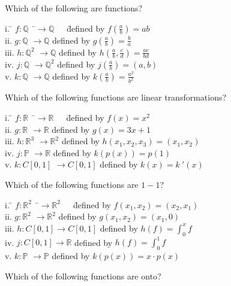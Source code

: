 \begin{myexb}[\bd{b}]
	Which of the following are functions?
	\begin{tabbing}
		\indent i. \quad \= $f:\mathbb{Q}$ \ \=$\rightarrow \mathbb{Q} $\ \ \   \=defined by $f(\frac{a}{b})= ab$   \\
		\indent ii. \> $g:\mathbb{Q}$ \>$\rightarrow \mathbb{Q} $ \>defined by  $g(\frac{a}{b}) = \frac{b}{a}$ \\ 
		\indent iii. \> $h:\mathbb{Q}^2 $ \>$\rightarrow \mathbb{Q} $ \>defined by  $h(\frac{a}{b},\frac{c}{d}) = \frac{ac}{bd}$  \\
		\indent iv. \>  $j:\mathbb{Q} $ \>$\rightarrow \mathbb{Q}^2 $ \>defined by  $j(\frac{a}{b}) = (a,b)$  \\  
		\indent v. \>  $k:\mathbb{Q} $ \>$\rightarrow \mathbb{Q} $ \>defined by  $k(\frac{a}{b}) = \frac{a^2}{b^2}$  
	\end{tabbing}
	Which of the following functions are linear transformations?
	\begin{tabbing}
		\indent i. \quad \= $f:\mathbb{R}$ \ \=$\rightarrow \mathbb{R} $\ \ \   \=defined by $f(x)= x^2$   \\
		\indent ii. \> $g:\mathbb{R}$ \>$\rightarrow \mathbb{R} $ \>defined by  $g(x) = 3x+1$ \\ 
		\indent iii. \> $h:\mathbb{R}^3 $ \>$\rightarrow \mathbb{R}^2 $ \>defined by  $h(x_1,x_2,x_3) = (x_1,x_2)$  \\
		\indent iv. \>  $j:\mathbb{P} $ \>$\rightarrow \mathbb{R}$ \>defined by  $k(p(x)) = p(1)$ \\
		\indent v. \>  $k:C[0,1] $ $\rightarrow C[0,1] $ defined by  $k(x) = k\ '(x)$      
	\end{tabbing} 
	Which of the following functions are $1-1$? 
	\begin{tabbing}
		\indent i. \quad \= $f:\mathbb{R}^2$ \ \=$\rightarrow \mathbb{R}^2 $\ \ \   \=defined by $f(x_1,x_2)= (x_2 ,x_1)$  \\
		\indent ii. \> $g:\mathbb{R}^2$ \>$\rightarrow \mathbb{R}^2 $ \>defined by  $g(x_1, x_2) = (x_1,0) $ \\ 
		\indent iii. \> $h:C[0,1] \rightarrow C[0,1] $ defined by  $h(f) = \int^x_0f $  \\
		\indent iv. \>  $j:C[0,1] \rightarrow \mathbb{R} $ defined by  $h(f) = \int^1_0f $  \\
		\indent v. \>  $k:\mathbb{P} $ \>$\rightarrow \mathbb{P}$ \>defined by  $k(p(x)) = x\cdot p(x)$
	\end{tabbing}
	Which of the following functions are onto?

\end{myexb}
